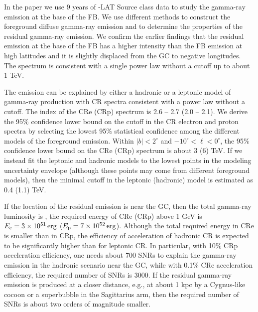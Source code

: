 In the paper we use 9 years of \Fermi-LAT Source class data to study the gamma-ray emission
at the base of the FB.
We use different methods to construct the foreground diffuse gamma-ray emission and to determine
the properties of the residual gamma-ray emission.
We confirm the earlier findings that the residual emission at the base of the FB
has a higher intensity than the FB emission at high latitudes and
it is slightly displaced from the GC to negative longitudes.
The spectrum is consistent with a single power law without a cutoff up to about 1 TeV.

The emission can be explained by either a hadronic or a leptonic model of gamma-ray production
with CR spectra consistent with a power law without a cutoff.
The index of the CRe (CRp) spectrum is 2.6 -- 2.7 (2.0 -- 2.1).
We derive the 95\% confidence lower bound on the cutoff in the CR electron and proton spectra
by selecting the lowest 95\% statistical confidence among the different models of the foreground emission.
Within $|b| < 2^\circ$ and $-10^\circ < \ell < 0^\circ$, the 95\% confidence lower bound on the CRe (CRp) spectrum is
about 3 (6) TeV.
If we instead fit the leptonic and hadronic models to the lowest points in the modeling uncertainty
envelope (although these points may
come from different foreground models), then the minimal cutoff in the leptonic (hadronic) model
is estimated as 0.4 (1.1) TeV.

If the location of the residual emission is near the GC,
then the total gamma-ray luminosity is ,
the required energy of CRe (CRp) above 1 GeV is $E_{\rm e} = \SI{3e51}{erg}$
($E_{\rm p} = \SI{7e52}{erg}$).
Although the total required energy in CRe is smaller than in CRp,
the efficiency of acceleration of hadronic CR is expected to be significantly higher than for leptonic CR.
In particular, with 10\% CRp acceleration efficiency, one needs about 700 SNRs to explain the 
gamma-ray emission in the hadronic scenario near the GC,
while with 0.1\% CRe acceleration efficiency, the required number of SNRs is 3000.
If the residual gamma-ray emission is produced at a closer distance, e.g., at about 1 kpc
by a Cygnus-like cocoon or a superbubble in the Sagittarius arm, 
then the required number of SNRs is about two orders of magnitude smaller.


